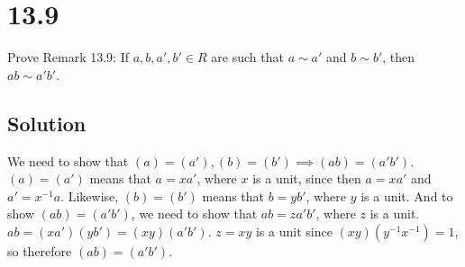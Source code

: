\documentclass[fleqn]{article}
\begin{document}
    \section{13.9}
    Prove Remark 13.9: If $a, b, a', b' \in R$ are such that $a \sim a'$ and $b \sim b'$, then $ab \sim a'b'$.
        
        \subsection{Solution}
        We need to show that $(a) = (a'), (b) = (b') \implies (ab) = (a'b')$.  $(a) = (a')$ means that $a = xa'$, where $x$ is a unit, since then $a = xa'$ and $a' = x^{-1}a$.  Likewise, $(b) = (b')$ means that $b = yb'$, where $y$ is a unit.  And to show $(ab) = (a'b')$, we need to show that $ab = za'b'$, where $z$ is a unit.  $ab = (xa')(yb') = (xy)(a'b')$.  $z = xy$ is a unit since $(xy)(y^{-1}x^{-1}) = 1$, so therefore $(ab) = (a'b')$.
    
\end{document}
